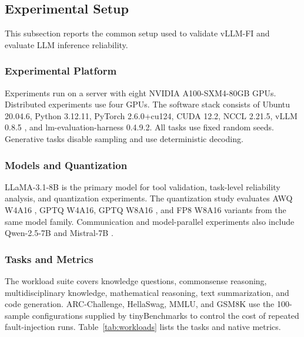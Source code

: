\subsection{Experimental Setup}
\label{sec:experimental_setup}

This subsection reports the common setup used to validate vLLM-FI and evaluate LLM inference reliability.

\subsubsection{Experimental Platform}
\label{subsec:platform_workloads}

Experiments run on a server with eight NVIDIA A100-SXM4-80GB GPUs. Distributed experiments use four GPUs. The software stack consists of Ubuntu 20.04.6, Python 3.12.11, PyTorch 2.6.0+cu124, CUDA 12.2, NCCL 2.21.5, vLLM 0.8.5 \cite{kwon2023efficient}, and lm-evaluation-harness 0.4.9.2. All tasks use fixed random seeds. Generative tasks disable sampling and use deterministic decoding.

\subsubsection{Models and Quantization}

LLaMA-3.1-8B \cite{grattafiori2024llama} is the primary model for tool validation, task-level reliability analysis, and quantization experiments. The quantization study evaluates AWQ W4A16 \cite{lin2024awq}, GPTQ W4A16, GPTQ W8A16 \cite{frantar2022gptq}, and FP8 W8A16 \cite{kuzmin2022fp8} variants from the same model family. Communication and model-parallel experiments also include Qwen-2.5-7B \cite{yang2024qwen25} and Mistral-7B \cite{jiang2023mistral}.

\subsubsection{Tasks and Metrics}

The workload suite covers knowledge questions, commonsense reasoning, multidisciplinary knowledge, mathematical reasoning, text summarization, and code generation. ARC-Challenge, HellaSwag, MMLU, and GSM8K use the 100-sample configurations supplied by tinyBenchmarks \cite{polo2024tinybenchmarks} to control the cost of repeated fault-injection runs. Table~\ref{tab:workloads} lists the tasks and native metrics.

